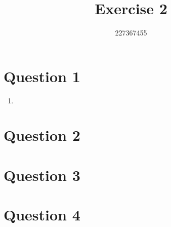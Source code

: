 \documentclass{article}
\begin{document}
    \title{Exercise 2}
    \author{227367455}
    \date{}
    \maketitle

    \section*{Question 1}
    \begin{enumerate}
        \item 
    \end{enumerate}
    \section*{Question 2}
    \section*{Question 3}
    \section*{Question 4}
\end{document}
